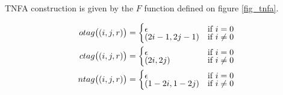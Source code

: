 \documentclass[AMA,STIX1COL]{WileyNJD-v2}
\begin{document}
TNFA construction is given by the $F$ function defined on figure \ref{fig_tnfa}.

    \begin{align*}
    otag \big( (i, j, r) \big) &=
        \begin{cases}
            \epsilon         &\text{if } i = 0 \\[-0.5em]
            (2i - 1, 2j - 1) &\text{if } i \neq 0
        \end{cases}
    \\
    ctag \big( (i, j, r) \big) &=
        \begin{cases}
            \epsilon &\text{if } i = 0 \\[-0.5em]
            (2i, 2j) \hphantom{{} - 1 {} - 1} &\text{if } i \neq 0
        \end{cases}
    \\
    ntag \big( (i, j, r) \big) &=
        \begin{cases}
            \epsilon         &\text{if } i = 0 \\[-0.5em]
            (1 - 2i, 1 - 2j) &\text{if } i \neq 0
        \end{cases}
    \end{align*}
\end{document}
